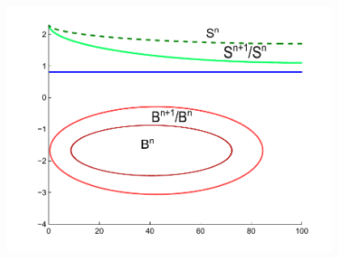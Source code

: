 \documentclass{beamer}
\begin{document}
\begin{frame}
\begin{columns}
{	}
	\begin{figure}[hbt]
	  \includegraphics[scale = 0.4]{PolicyImproveValue1.pdf}
	\end{figure}
\end{columns}

\end{frame}

\end{document}
